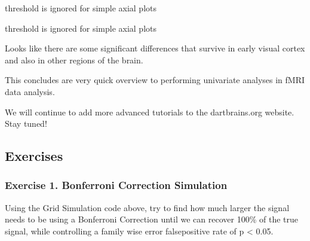 \documentclass[letterpaper,10pt,english]{sphinxmanual}
\begin{document}
\begin{sphinxVerbatim}[commandchars=\\\{\}]
threshold is ignored for simple axial plots
\end{sphinxVerbatim}

\noindent{}

\begin{sphinxVerbatim}[commandchars=\\\{\}]
  
\PYG{p}{[}\PYG{p}{]}
\end{sphinxVerbatim}

\begin{sphinxVerbatim}[commandchars=\\\{\}]
threshold is ignored for simple axial plots
\end{sphinxVerbatim}

\noindent{}

Looks like there are some significant differences that survive in early visual cortex and also in other regions of the brain.

This concludes are very quick overview to performing univariate analyses in fMRI data analysis.

We will continue to add more advanced tutorials to the dartbrains.org website. Stay tuned!


\subsection{Exercises}
\label{\detokenize{content/Thresholding_Group_Analyses:exercises}}

\subsubsection{Exercise 1. Bonferroni Correction Simulation}
\label{\detokenize{content/Thresholding_Group_Analyses:exercise-1-bonferroni-correction-simulation}}
Using the Grid Simulation code above, try to find how much larger the signal needs to be using a Bonferroni Correction until we can recover 100\% of the true signal, while controlling a family wise error false\sphinxhyphen{}positive rate of p \textless{} 0.05.
\end{document}
